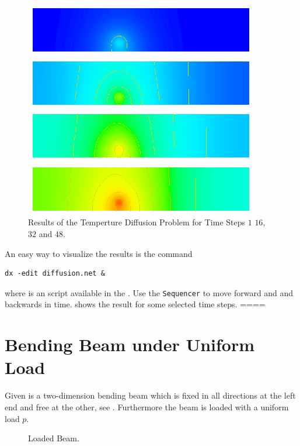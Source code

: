 \begin{figure}
\centerline{\includegraphics[width=\figwidth]{DiffusionRes1}}
\centerline{\includegraphics[width=\figwidth]{DiffusionRes16}}
\centerline{\includegraphics[width=\figwidth]{DiffusionRes32}}
\centerline{\includegraphics[width=\figwidth]{DiffusionRes48}}
\caption{Results of the Temperture Diffusion Problem for Time Steps $1$ $16$, $32$ and $48$.}
\label{DIFFUSION FIG 2}
\end{figure}

An easy way to visualize the results is the command
\begin{verbatim}
dx -edit diffusion.net &
\end{verbatim}
where  is an \OpenDX script available in the \ExampleDirectory.
Use the \texttt{Sequencer} to move forward and and backwards in time. 
 shows the result for some selected time steps.
====
\section{Bending Beam under Uniform Load}
\label{BEAM CHAP}

Given is a two-dimension bending beam which is fixed in all directions
at the left end and free at the other, see . Furthermore the beam is loaded
with a uniform load $p$.

\begin{figure}
\caption{Loaded Beam.}
\label{BEAM FIG 1}
\end{figure}



